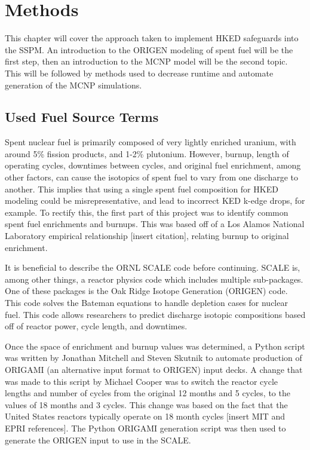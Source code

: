 \chapter{Methods}\label{ch:methods}
This chapter will cover the approach taken to implement HKED safeguards into the SSPM. An introduction to the ORIGEN modeling of spent fuel will be the first step, then an introduction to the MCNP model will be the second topic. This will be followed by methods used to decrease runtime and automate generation of the MCNP simulations.


\section{Used Fuel Source Terms}
Spent nuclear fuel is primarily composed of very lightly enriched uranium, with around 5\% fission products, and 1-2\% plutonium. However, burnup, length of operating cycles, downtimes between cycles, and original fuel enrichment, among other factors, can cause the isotopics of spent fuel to vary from one discharge to another. This implies that using a single spent fuel composition for HKED modeling could be misrepresentative, and lead to incorrect KED k-edge drops, for example. To rectify this, the first part of this project was to identify common spent fuel enrichments and burnups. This was based off of a Los Alamos National Laboratory empirical relationship [insert citation], relating burnup to original enrichment. 

It is beneficial to describe the ORNL SCALE code before continuing. SCALE is, among other things, a reactor physics code which includes multiple sub-packages. One of these packages is the Oak Ridge Isotope Generation (ORIGEN) code. This code solves the Bateman equations to handle depletion cases for nuclear fuel. This code allows researchers to predict discharge isotopic compositions based off of reactor power, cycle length, and downtimes. 

Once the space of enrichment and burnup values was determined, a Python script was written by Jonathan Mitchell and Steven Skutnik to automate production of ORIGAMI (an alternative input format to ORIGEN) input decks. A change that was made to this script by Michael Cooper was to switch the reactor cycle lengths and number of cycles from the original 12 months and 5 cycles, to the values of 18 months and 3 cycles. This change was based on the fact that the United States reactors typically operate on 18 month cycles [insert MIT and EPRI references]. The Python ORIGAMI generation script was then used to generate the ORIGEN input to use in the SCALE. 

